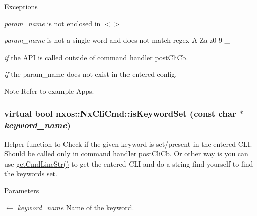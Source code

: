 \begin{DoxyExceptions}{Exceptions}
\item[{\em param\_\-name}]is not enclosed in $<$$>$ \item[{\em param\_\-name}]is not a single word and does not match regex A-\/Za-\/z0-\/9-\/\_\- \item[{\em if}]the API is called outside of command handler postCliCb. \item[{\em if}]the param\_\-name does not exist in the entered config. \end{DoxyExceptions}
\begin{DoxyNote}{Note}
Refer to example Apps. 
\end{DoxyNote}
\hypertarget{classnxos_1_1NxCliCmd_af100c6495c0e383c8e3d11d5cdb68cd2}{
\subsubsection[{isKeywordSet}]{\setlength{\rightskip}{0pt plus 5cm}virtual bool nxos::NxCliCmd::isKeywordSet (const char $\ast$ {\em keyword\_\-name})}}
\label{classnxos_1_1NxCliCmd_af100c6495c0e383c8e3d11d5cdb68cd2}
Helper function to Check if the given keyword is set/present in the entered CLI. Should be called only in command handler postCliCb. Or other way is you can use \hyperlink{classnxos_1_1NxCliCmd_a3d856a7d4350f027df53960053901c96}{getCmdLineStr()} to get the entered CLI and do a string find yourself to find the keywords set.


\begin{DoxyParams}{Parameters}
\item[\mbox{$\leftarrow$} {\em keyword\_\-name}]Name of the keyword.\end{DoxyParams}



